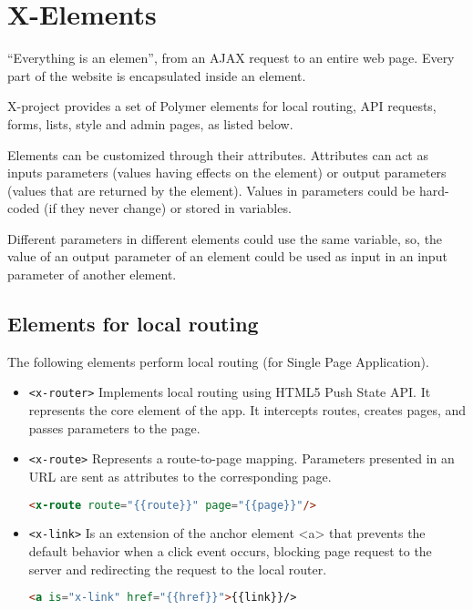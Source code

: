 \section{X-Elements}
\label{sec:XPR_xel}

``Everything is an elemen'', from an AJAX request to an entire web page. Every part of the website is encapsulated inside an element.

X-project provides a set of Polymer elements for local routing, API requests, forms, lists, style and admin pages, as listed below.

Elements can be customized through their attributes. Attributes can act as inputs parameters (values having effects on the element) or output parameters (values that are returned by the element). Values in parameters could be hard-coded (if they never change) or stored in variables.

Different parameters in different elements could use the same variable, so, the value of an output parameter of an element could be used as input in an input parameter of another element.

\subsection{Elements for local routing}

The following elements perform local routing (for Single Page Application).
\begin{itemize}
\item \texttt{<x-router>} Implements local routing using HTML5 Push State API. It represents the core element of the app. It intercepts routes, creates pages, and passes parameters to the page.
\item \texttt{<x-route>} Represents a route-to-page mapping. Parameters presented in an URL are sent as attributes to the corresponding page.
\begin{lstlisting}[language=html]
<x-route route="{{route}}" page="{{page}}"/>
\end{lstlisting}
\item \texttt{<x-link>} Is an extension of the anchor element <a> that prevents the default behavior when a click event occurs, blocking page request to the server and redirecting the request to the local router.
\begin{lstlisting}[language=html]
<a is="x-link" href="{{href}}">{{link}}/>
\end{lstlisting}
\end{itemize}


